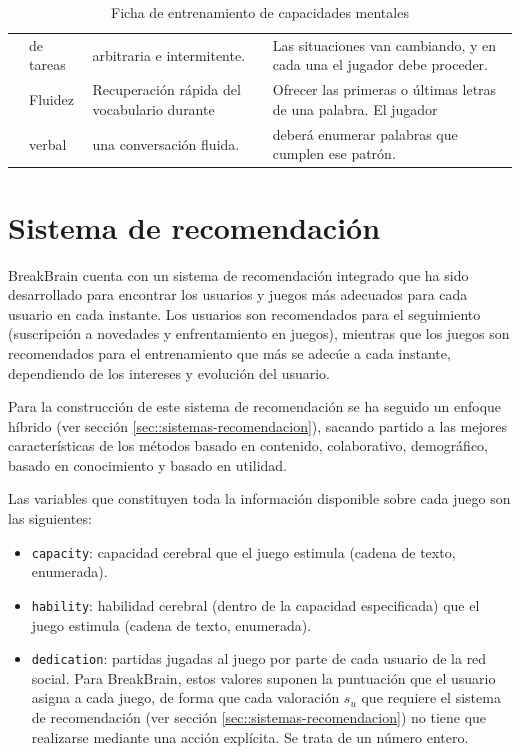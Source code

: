 \begin{table}[H]
\begin{footnotesize}
\begin{center}
\begin{sideways}
\begin{tabular}{|c|l|l|l|}
& de tareas & arbitraria e intermitente. & Las situaciones van cambiando, y en cada una el jugador debe proceder. \\
\cline{2-4}
& Fluidez  & Recuperación rápida del vocabulario durante & Ofrecer las primeras o últimas letras de una palabra. El jugador \\
& verbal & una conversación fluida. & deberá enumerar palabras que cumplen ese patrón. \\
\hline
\end{tabular}
\end{sideways}
\end{center}
\end{footnotesize}
\caption{Ficha de entrenamiento de capacidades mentales}
\label{table:capacidades}
\end{table}



\section{Sistema de recomendación}

BreakBrain cuenta con un sistema de recomendación integrado que ha sido desarrollado para encontrar los usuarios y juegos más adecuados para cada usuario en cada instante. Los usuarios son recomendados para el seguimiento (suscripción a novedades y enfrentamiento en juegos), mientras que los juegos son recomendados para el entrenamiento que más se adecúe a cada instante, dependiendo de los intereses y evolución del usuario.

Para la construcción de este sistema de recomendación se ha seguido un enfoque híbrido (ver sección \ref{sec::sistemas-recomendacion}), sacando partido a las mejores características de los métodos basado en contenido, colaborativo, demográfico, basado en conocimiento y basado en utilidad.

Las variables que constituyen toda la información disponible sobre cada juego son las siguientes:

\begin{itemize}
\item {\tt capacity}: capacidad cerebral que el juego estimula (cadena de texto, enumerada).
\item {\tt hability}: habilidad cerebral (dentro de la capacidad especificada) que el juego estimula (cadena de texto, enumerada).
\item {\tt dedication}: partidas jugadas al juego por parte de cada usuario de la red social. Para BreakBrain, estos valores suponen la puntuación que el usuario asigna a cada juego, de forma que cada valoración $s_u$ que requiere el sistema de recomendación (ver sección \ref{sec::sistemas-recomendacion}) no tiene que realizarse mediante una acción explícita. Se trata de un número entero.
\end{itemize}

